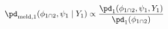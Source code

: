 \begin{equation}
  \pd_{\text{meld}, 1} (\phi_{1 \cap 2}, \psi_{1} \mid Y_{1}) \propto
  \frac {
    \pd_{1}(\phi_{1 \cap 2}, \psi_{1}, Y_{1})
  } {
    \pd_{1}(\phi_{1 \cap 2})
  }
  \label{eqn:stage-one-target}
\end{equation}
